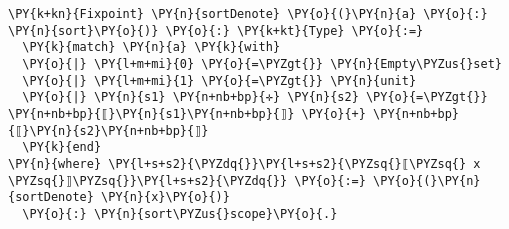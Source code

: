 \begin{Verbatim}[commandchars=\\\{\}]
\PY{k+kn}{Fixpoint} \PY{n}{sortDenote} \PY{o}{(}\PY{n}{a} \PY{o}{:} \PY{n}{sort}\PY{o}{)} \PY{o}{:} \PY{k+kt}{Type} \PY{o}{:=}
  \PY{k}{match} \PY{n}{a} \PY{k}{with}
  \PY{o}{|} \PY{l+m+mi}{𝟶} \PY{o}{=\PYZgt{}} \PY{n}{Empty\PYZus{}set}
  \PY{o}{|} \PY{l+m+mi}{𝟷} \PY{o}{=\PYZgt{}} \PY{n}{unit}
  \PY{o}{|} \PY{n}{s1} \PY{n+nb+bp}{✛} \PY{n}{s2} \PY{o}{=\PYZgt{}} \PY{n+nb+bp}{⟦}\PY{n}{s1}\PY{n+nb+bp}{⟧} \PY{o}{+} \PY{n+nb+bp}{⟦}\PY{n}{s2}\PY{n+nb+bp}{⟧}
  \PY{k}{end}
\PY{n}{where} \PY{l+s+s2}{\PYZdq{}}\PY{l+s+s2}{\PYZsq{}⟦\PYZsq{} x \PYZsq{}⟧\PYZsq{}}\PY{l+s+s2}{\PYZdq{}} \PY{o}{:=} \PY{o}{(}\PY{n}{sortDenote} \PY{n}{x}\PY{o}{)}
  \PY{o}{:} \PY{n}{sort\PYZus{}scope}\PY{o}{.}
\end{Verbatim}
